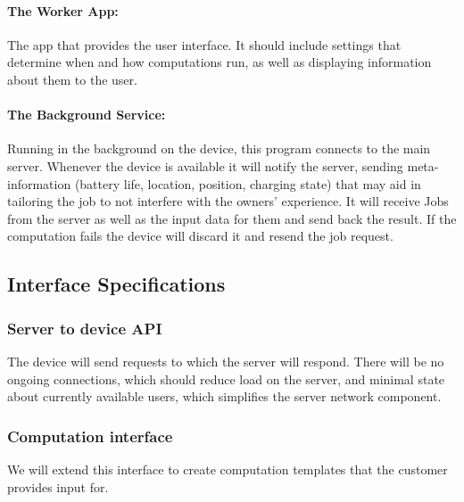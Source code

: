 \documentclass[a4paper,10pt]{article}
\begin{document}
\paragraph{The Worker App:}

The app that provides the user interface. It should include settings that determine when and how computations run, as well as displaying information about them to the user.

\paragraph{The Background Service:} 
Running in the background on the device, this program connects to the main server. Whenever the device is available it will notify the server, sending meta-information (battery life, location, position, charging state) that may aid in tailoring the job to not interfere with the owners' experience. It will receive Jobs from the server as well as the input data for them and send back the result. If the computation fails the device will discard it and resend the job request.



\subsection{Interface Specifications}


\subsubsection{Server to device API}

The device will send requests to which the server will respond.
There will be no ongoing connections, which should reduce load on the server, and minimal state about currently available users, which simplifies the server network component.



\newpage
\subsubsection{Computation interface}

We will extend this interface to create computation templates that the customer provides input for.

\newpage



\end{document}
